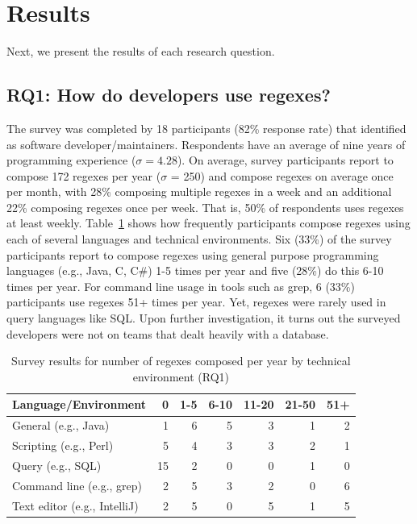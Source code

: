 \section{Results}
\label{sec:results}



Next, we present the results of each research question.

\subsection{RQ1: How do developers use regexes?}
\label{rq1:survey}
The survey was completed by 18 participants (82\% response rate) that identified as software developer/maintainers.
Respondents have an average of nine years of programming experience ($\sigma = 4.28$).
On average, survey participants report to compose 172 regexes per year ($\sigma$ = 250) and compose regexes on average once per month, with 28\% composing multiple regexes in a week and an additional 22\% composing regexes once per week. That is, 50\% of respondents uses regexes at least weekly.
Table~\ref{tab:regexenviron} shows how frequently participants compose regexes using each of several languages and technical environments.
Six (33\%) of the survey participants report to compose regexes using general purpose programming languages (e.g., Java, C, C\#) 1-5 times per year and five (28\%) do this 6-10 times per year.  For command line usage in tools such as grep, 6 (33\%) participants use regexes 51+ times per year. Yet, regexes were rarely used in query languages like SQL. Upon further investigation, it turns out the surveyed developers were not on teams that dealt heavily with a database.



\newcommand{\horiz}{\hspace{2.1pt}}

\begin{table}[t]
\caption{Survey results for number of regexes composed per year by technical environment (RQ1) \label{tab:regexenviron}}
\begin{center}
\begin{small}
\begin{tabular}{l | r @{  \horiz} r @{ \horiz } r @{ \horiz } r @{ \horiz } r @{ \horiz } r }
\toprule
\textbf{Language/Environment} & 0 & 1-5 & 6-10 & 11-20 & 21-50 & 51+ \\  \hline \bigstrut
General  (e.g., Java)  & 1 & 6 & 5 & 3& 1& 2 \\ \hline \bigstrut
Scripting  (e.g., Perl) &5 &4 &3 &3 &2  &1 \\ \hline \bigstrut
Query  (e.g., SQL) & 15&2 &0 &0 &1  & 0\\ \hline \bigstrut
Command line (e.g., grep)   &2 &5 &3 &2 &0  &6 \\ \hline \bigstrut
Text editor (e.g., IntelliJ)   & 2& 5& 0& 5& 1& 5\\
\bottomrule
\end{tabular}
\end{small}
\end{center}
\vspace{-12pt}
\end{table}

